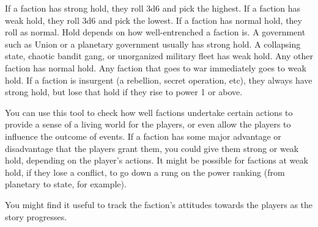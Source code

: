If a faction has strong hold, they roll 3d6 and pick the highest. If a faction has weak hold, they roll  
3d6 and pick the lowest. If a faction has normal hold, they roll as normal. Hold depends on how  
well-entrenched a faction is. A government such as Union or a planetary government usually has  
strong hold. A collapsing state, chaotic bandit gang, or unorganized military fleet has weak hold.  
Any other faction has normal hold. Any faction that goes to war immediately goes to weak hold. If  
a faction is insurgent (a rebellion, secret operation, etc), they always have strong hold, but lose  
that hold if they rise to power 1 or above.  

You can use this tool to check how well factions undertake certain actions to provide a sense of a  
living world for the players, or even allow the players to influence the outcome of events. If a  
faction has some major advantage or disadvantage that the players grant them, you could give  
them strong or weak hold, depending on the player’s actions. It might be possible for factions at  
weak hold, if they lose a conflict, to go down a rung on the power ranking (from planetary to state,  
for example).  

You might find it useful to track the faction’s attitudes towards the players as the story progresses.  

                                                                                            